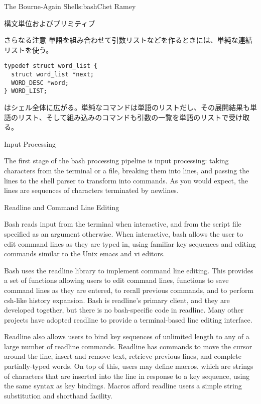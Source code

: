 \begin{aosachapter}{The Bourne-Again Shell}{s:bash}{Chet Ramey}
\begin{aosasect1}{構文単位およびプリミティブ}
\begin{aosasect2}{さらなる注意}
\noindent 単語を組み合わせて引数リストなどを作るときには、単純な連結リストを使う。

\begin{verbatim}
typedef struct word_list {
  struct word_list *next;
  WORD_DESC *word;
} WORD_LIST;
\end{verbatim}

はシェル全体に広がる。単純なコマンドは単語のリストだし、その展開結果も単語のリスト、そして組み込みのコマンドも引数の一覧を単語のリストで受け取る。

\end{aosasect2}

\end{aosasect1}

\begin{aosasect1}{Input Processing}

The first stage of the bash processing pipeline is input processing:
taking characters from the terminal or a file, breaking them into
lines, and passing the lines to the shell parser to transform into
commands.  As you would expect, the lines are
sequences of characters terminated by newlines.

\begin{aosasect2}{Readline and Command Line Editing}

Bash reads input from the terminal when interactive, and from the
script file specified as an argument otherwise.  When interactive,
bash allows the user to edit command lines as they are typed in, using
familiar key sequences and editing commands similar to the Unix emacs
and vi editors.

Bash uses the readline library to implement command line editing.
This provides a set of functions allowing users to edit command lines,
functions to save command lines as they are entered, to recall
previous commands, and to perform csh-like history expansion.  Bash is
readline's primary client, and they are developed together, but there
is no bash-specific code in readline.  Many other projects have
adopted readline to provide a terminal-based line editing interface.

Readline also allows users to bind key sequences of unlimited length
to any of a large number of readline commands.  Readline has commands
to move the cursor around the line, insert and remove text, retrieve
previous lines, and complete partially-typed words.  On top of this,
users may define macros, which are strings of characters that are
inserted into the line in response to a key sequence, using the same
syntax as key bindings.  Macros afford readline users a simple string
substitution and shorthand facility.


\end{aosasect2}
\end{aosasect1}
\end{aosachapter}
